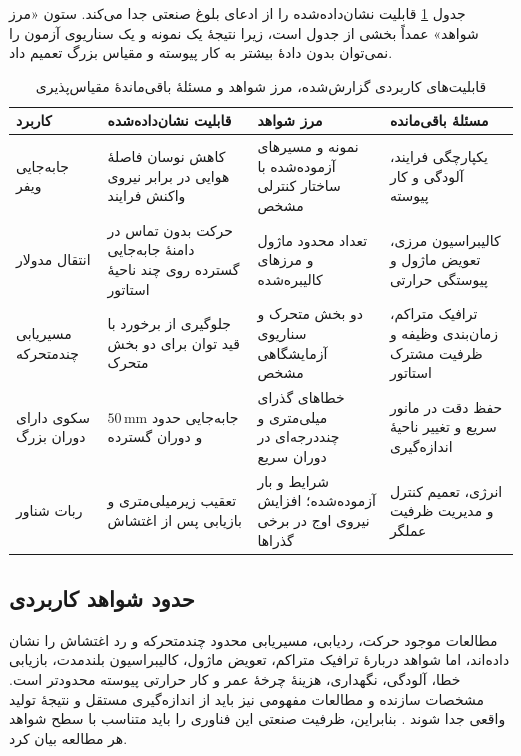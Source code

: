 جدول \ref{tab:application-evidence-boundaries} قابلیت نشان‌داده‌شده را از ادعای بلوغ صنعتی جدا می‌کند. ستون «مرز شواهد» عمداً بخشی از جدول است، زیرا نتیجهٔ یک نمونه و یک سناریوی آزمون را نمی‌توان بدون دادهٔ بیشتر به کار پیوسته و مقیاس بزرگ تعمیم داد.

\begin{table}[htbp]
	\centering
	\caption{قابلیت‌های کاربردی گزارش‌شده، مرز شواهد و مسئلهٔ باقی‌ماندهٔ مقیاس‌پذیری}
	\label{tab:application-evidence-boundaries}
	\renewcommand{\arraystretch}{1.25}
	\setlength{\tabcolsep}{3pt}
	\scriptsize
	\begin{tabular}{|p{}|p{}|p{}|p{}|}
		\hline
		\textbf{کاربرد} & \textbf{قابلیت نشان‌داده‌شده} & \textbf{مرز شواهد} & \textbf{مسئلهٔ باقی‌مانده} \\
		\hline
		جابه‌جایی ویفر & کاهش نوسان فاصلهٔ هوایی در برابر نیروی واکنش فرایند \cite{haRobustAirgapStabilization2026} & نمونه و مسیرهای آزموده‌شده با ساختار کنترلی مشخص & یکپارچگی فرایند، آلودگی و کار پیوسته \\
		\hline
		انتقال مدولار & حرکت بدون تماس در دامنهٔ جابه‌جایی گسترده روی چند ناحیهٔ استاتور \cite{xuModularMaglevDesign2024d} & تعداد محدود ماژول و مرزهای کالیبره‌شده & کالیبراسیون مرزی، تعویض ماژول و پیوستگی حرارتی \\
		\hline
		مسیریابی چندمتحرکه & جلوگیری از برخورد با قید توان برای دو بخش متحرک \cite{wangRealtimeRelativeMap2025} & دو بخش متحرک و سناریوی آزمایشگاهی مشخص & ترافیک متراکم، زمان‌بندی وظیفه و ظرفیت مشترک استاتور \\
		\hline
		سکوی دارای دوران بزرگ & جابه‌جایی حدود \(50\,\mathrm{mm}\) و دوران گسترده \cite{miyasakaMagneticLevitationUnlimited2014} & خطاهای گذرای میلی‌متری و چنددرجه‌ای در دوران سریع & حفظ دقت در مانور سریع و تغییر ناحیهٔ اندازه‌گیری \\
		\hline
		ربات شناور & تعقیب زیرمیلی‌متری و بازیابی پس از اغتشاش \cite{wangRealTimeDeepReinforcement2026d} & شرایط و بار آزموده‌شده؛ افزایش نیروی اوج در برخی گذراها & انرژی، تعمیم کنترل و مدیریت ظرفیت عملگر \\
		\hline
	\end{tabular}
\end{table}

\subsection{حدود شواهد کاربردی}
\label{subsec:manufacturing-robotics-summary}

مطالعات موجود حرکت، ردیابی، مسیریابی محدود چندمتحرکه و رد اغتشاش را نشان داده‌اند، اما شواهد دربارهٔ ترافیک متراکم، تعویض ماژول، کالیبراسیون بلندمدت، بازیابی خطا، آلودگی، نگهداری، هزینهٔ چرخهٔ عمر و کار حرارتی پیوسته محدودتر است. مشخصات سازنده و مطالعات مفهومی نیز باید از اندازه‌گیری مستقل و نتیجهٔ تولید واقعی جدا شوند \cite{maoStudioDinamicoDi2024}. بنابراین، ظرفیت صنعتی این فناوری را باید متناسب با سطح شواهد هر مطالعه بیان کرد.

